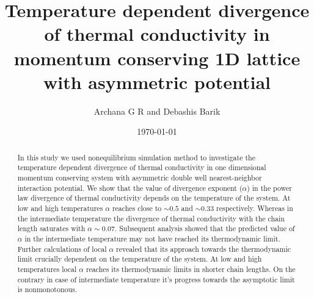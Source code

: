 \documentclass[aps,pre,reprint,groupedaddress]{revtex4-1}
\begin{document}

\title{Temperature dependent divergence of thermal conductivity in momentum conserving 1D lattice with asymmetric potential}


\author{Archana G R and Debashis Barik}


\date{\today}

\begin{abstract}
In this study we used nonequilibrium simulation method to investigate the temperature dependent divergence of thermal conductivity in one dimensional momentum conserving system with asymmetric double well nearest-neighbor interaction potential. We show that the value of divergence exponent ($\alpha$) in the power law divergence of thermal conductivity depends on the temperature of the system. At low and high temperatures $\alpha$ reaches close to $\sim0.5$ and $\sim0.33$ respectively. Whereas in the intermediate temperature the divergence of thermal conductivity with the chain length saturates with $\alpha\sim0.07$. Subsequent analysis showed that the predicted value of $\alpha$ in the intermediate temperature may not have reached its thermodynamic limit. Further calculations of local $\alpha$ revealed that its approach towards the thermodynamic limit crucially dependent on the temperature of the system. At low and high temperatures local $\alpha$ reaches its thermodynamic limits in shorter chain lengths. On the contrary in case of intermediate temperature it's progress towards the asymptotic limit is nonmonotonous. 
\end{abstract}
\end{document}
